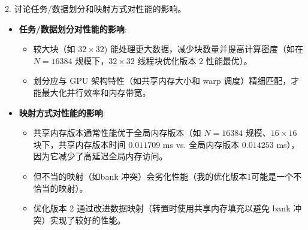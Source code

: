 \documentclass{SYSUReport}
\begin{document}
2. 讨论任务/数据划分和映射方式对性能的影响。

\begin{itemize}
  \item \textbf{任务/数据划分对性能的影响}:
  \begin{itemize}
    \item 较大块（如 $32\times32$) 能处理更大数据，减少块数量并提高计算密度（如在 $N=16384$ 规模下，$32\times32$ 线程块优化版本 2 性能最优）。
    \item 划分应与 GPU 架构特性（如共享内存大小和 warp 调度）精细匹配，才能最大化并行效率和内存带宽。
  \end{itemize}
  
  \item \textbf{映射方式对性能的影响}:
  \begin{itemize}
    \item 共享内存版本通常性能优于全局内存版本（如 $N=16384$ 规模、$16\times16$ 块下，共享内存版本时间 $0.011709$ ms vs. 全局内存版本 $0.014253$ ms），因为它减少了高延迟全局内存访问。
    \item 但不当的映射（如bank 冲突）会劣化性能（我的优化版本1可能是一个不恰当的映射）。
    \item 优化版本 2 通过改进数据映射（转置时使用共享内存填充以避免 bank 冲突）实现了较好的性能。
  \end{itemize}
\end{itemize}



\end{document}
